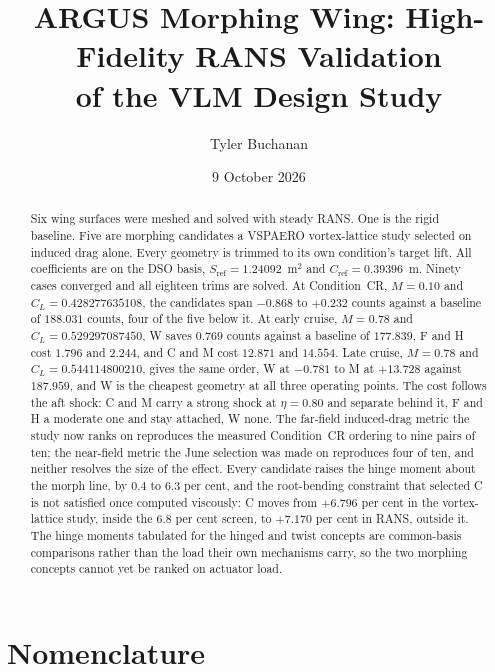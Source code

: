 \documentclass[10pt,a4paper]{article}
\title{ARGUS Morphing Wing: High-Fidelity RANS Validation\\of the VLM Design Study}
\author{Tyler Buchanan}
\date{9 October 2026}
\begin{document}
\maketitle

\begin{abstract}
\small\noindent
Six wing surfaces were meshed and solved with steady RANS. One is the rigid baseline. Five are
morphing candidates a VSPAERO vortex-lattice study selected on induced drag alone. Every geometry
is trimmed to its own condition's target lift. All coefficients are on the DSO basis,
$S_\mathrm{ref} = \num{1.24092}$~m$^2$ and $C_\mathrm{ref} = \num{0.39396}$~m. Ninety cases
converged and all eighteen trims are solved. At
Condition~CR, $M = 0.10$ and $C_L = 0.428277635108$, the candidates span $-0.868$ to $+0.232$
counts against a baseline of $188.031$ counts, four of the five below it. At early cruise,
$M = 0.78$ and $C_L = 0.529297087450$, W saves $0.769$ counts against a baseline of $177.839$, F
and H cost $1.796$ and $2.244$, and C and M cost $12.871$ and $14.554$. Late cruise, $M = 0.78$
and $C_L = 0.544114800210$, gives the same order, W at $-0.781$ to M at $+13.728$ against
$187.959$, and W is the cheapest geometry at all three operating points. The cost follows the
aft shock: C and M carry a strong shock at $\eta = 0.80$ and separate behind it, F and H a
moderate one and stay attached, W none. The far-field induced-drag metric the study now ranks on reproduces
the measured Condition~CR ordering to nine pairs of ten; the near-field metric the June selection
was made on reproduces four of ten, and neither resolves the size of the effect. Every candidate
raises the hinge moment about the morph line, by $0.4$ to $6.3$ per cent, and the root-bending
constraint that selected C is not satisfied once computed viscously: C moves from $+6.796$ per
cent in the vortex-lattice study, inside the $6.8$ per cent screen, to $+7.170$ per cent in RANS,
outside it. The hinge moments tabulated for the hinged and twist concepts are common-basis
comparisons rather than the load their own mechanisms carry, so the two morphing concepts cannot
yet be ranked on actuator load.
\end{abstract}

\tableofcontents

\section*{Nomenclature}
\label{sec:nomenclature}
\end{document}
